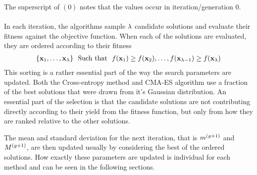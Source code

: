 The superscript of $(0)$ notes that the values occur in iteration/generation 0.\\
\\
In each iteration, the algorithms sample $\lambda$ candidate solutions 
and evaluate their fitness
against the objective function. When each of the solutions are evaluated,
they are ordered according to their fitness
\begin{align}
\{\textbf{\individual }_{1}, \hdots, 
\textbf{\individual }_{\populationSize }\}\ \ \text{Such that}\ \ 
\fitnessFunction(\textbf{x}_1) \geq 
\fitnessFunction(\textbf{\individual }_2), \hdots, 
\fitnessFunction(\textbf{\individual }_{\populationSize  - 1}) \geq 
\fitnessFunction(\textbf{\individual }_{\populationSize })
\end{align}
This sorting is a rather essential part of the way the search parameters are
updated. Both the Cross-entropy method and CMA-ES algorithm use a fraction of the 
best solutions that were drawn from it's Gaussian distribution. An essential 
part of the selection is that the candidate solutions are not contributing
directly according to their yield from the fitness function, but only from 
how they are ranked relative to the other solutions. 

The mean and standard deviation for the next iteration, 
that is $m^{(g+1)}$ and $M^{(g+1)}$, are
then updated usually by considering the best of the ordered solutions. How exactly
these parameters are updated is individual for each method and can be seen in the following
sections.


